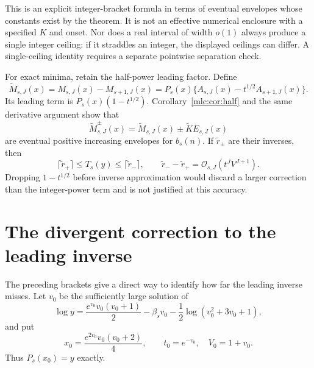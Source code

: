 \documentclass[11pt]{article}
\theoremstyle{remark}\newtheorem{remark}[theorem]{Remark}
\newcommand{\OO}{\mathcal O}
\begin{document}
This is an explicit integer-bracket formula in terms of eventual envelopes whose constants exist by the theorem. It is not an effective numerical enclosure with a specified $K$ and onset. Nor does a real interval of width $o(1)$ always produce a single integer ceiling: if it straddles an integer, the displayed ceilings can differ. A single-ceiling identity requires a separate pointwise separation check.

For exact minima, retain the half-power leading factor. Define
\begin{equation}\label{mlc:eq:bM}
 \widetilde M_{s,J}(x)=M_{s,J}(x)-M_{s+1,J}(x)
          =P_s(x)\{A_{s,J}(x)-t^{1/2}A_{s+1,J}(x)\}.
\end{equation}
Its leading term is $P_s(x)(1-t^{1/2})$. Corollary~\ref{mlc:cor:half} and the same derivative argument show that
\begin{equation}\label{mlc:eq:benvelopes}
 \widetilde M_{s,J}^{\pm}(x)=\widetilde M_{s,J}(x)
                                      \pm\widetilde K E_{s,J}(x)
\end{equation}
are eventual positive increasing envelopes for $b_s(n)$. If $\widetilde r_\pm$ are their inverses, then
\begin{equation}\label{mlc:eq:bbracket}
 \lceil\widetilde r_+\rceil\le T_s(y)\le\lceil\widetilde r_-\rceil,
 \qquad
 \widetilde r_--\widetilde r_+=\OO_{s,J}(t^JV^{J+1}).
\end{equation}
Dropping $1-t^{1/2}$ before inverse approximation would discard a larger correction than the integer-power term and is not justified at this accuracy.

\section{The divergent correction to the leading inverse}\label{mlc:sec:shift}
The preceding brackets give a direct way to identify how far the leading inverse misses. Let $v_0$ be the sufficiently large solution of
\begin{equation}\label{mlc:eq:v0}
 \log y=\frac{e^{v_0}v_0(v_0+1)}2-\beta_s v_0
                           -\frac12\log(v_0^2+3v_0+1),
\end{equation}
and put
\begin{equation}\label{mlc:eq:x0}
 x_0=\frac{e^{2v_0}v_0(v_0+2)}4,\qquad t_0=e^{-v_0},\quad V_0=1+v_0.
\end{equation}
Thus $P_s(x_0)=y$ exactly.
\end{document}
